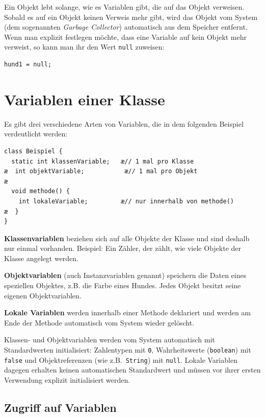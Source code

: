 Ein Objekt lebt solange, wie es Variablen gibt, die auf das Objekt verweisen.
Sobald es auf ein Objekt keinen Verweis mehr gibt, wird das Objekt vom System (dem sogenannten \emph{Garbage Collector})
automatisch aus dem Speicher entfernt. Wenn man explizit festlegen möchte, dass eine Variable auf
kein Objekt mehr verweist, so kann man ihr den Wert \lstinline|null| zuweisen:

\begin{lstlisting}
hund1 = null;
\end{lstlisting}


\section{Variablen einer Klasse}

Es gibt drei verschiedene Arten von Variablen, die in dem folgenden Beispiel
verdeutlicht werden:

\begin{lstlisting}
class Beispiel {
  static int klassenVariable;   æ// 1 mal pro Klasse
æ  int objektVariable;           æ// 1 mal pro Objekt
æ
  void methode() {
    int lokaleVariable;         æ// nur innerhalb von methode()
æ  }
}
\end{lstlisting}

\textbf{Klassenvariablen} beziehen sich auf alle Objekte der Klasse und sind
deshalb nur einmal vorhanden. Beispiel: Ein Zähler, der zählt, wie viele Objekte
der Klasse angelegt werden.

\textbf{Objektvariablen} (auch Instanzvariablen genannt) speichern die Daten eines speziellen Objektes, z.B.
die Farbe eines Hundes. Jedes Objekt besitzt seine eigenen Objektvariablen.

\textbf{Lokale Variablen} werden innerhalb einer Methode deklariert und werden
am Ende der Methode automatisch vom System wieder gelöscht.

Klassen- und Objektvariablen werden vom System automatisch mit Standardwerten initialisiert:
Zahlentypen mit \lstinline|0|, Wahrheitswerte (\lstinline|boolean|) mit \lstinline|false| und
Objektreferenzen (wie z.B.\ \lstinline|String|) mit \lstinline|null|.
Lokale Variablen dagegen erhalten keinen automatischen Standardwert und müssen vor ihrer
ersten Verwendung explizit initialisiert werden.


\subsection{Zugriff auf Variablen}


